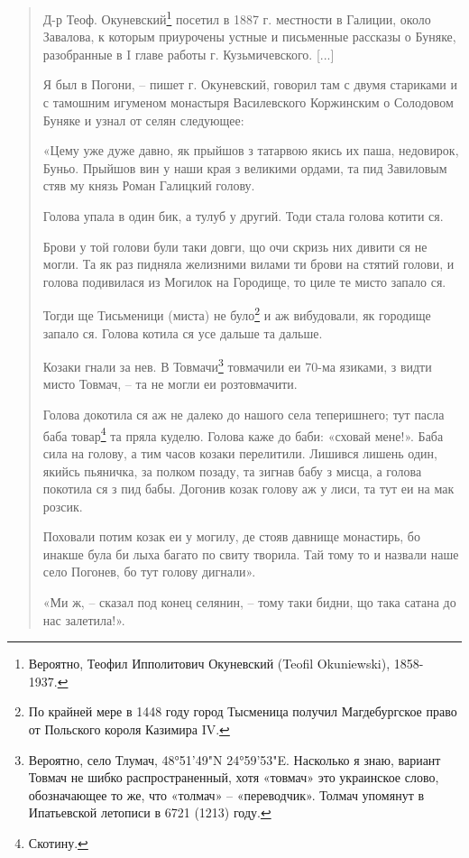 \begin{quotation}
Д-р Теоф. Окуневский\footnote{Вероятно, Теофил Ипполитович Окуневский (Teofil Okuniewski), 1858-1937.} посетил в 1887 г. местности в Галиции, около Завалова, к которым приурочены устные и письменные рассказы о Буняке, разобранные в I главе работы г. Кузьмичевского. [...]

Я был в Погони, – пишет г. Окуневский, говорил там с двумя стариками и с тамошним игуменом монастыря Василевского Коржинским о Солодовом Буняке и узнал от селян следующее: 

«Цему уже дуже давно, як прыйшов з татарвою якись их паша, недовирок, Буньо. Прыйшов вин у наши края з великими ордами, та пид Завиловым стяв му князь Роман Галицкий голову. 

Голова упала в один бик, а тулуб у другий. Тоди стала голова котити ся. 

Брови у той голови були таки довги, що очи скризь них дивити ся не могли. Та як раз пидняла желизними вилами ти брови на стятий голови, и голова подивилася из Могилок на Городище, то циле те мисто запало ся.

Тогди ще Тисьменици (миста) не було\footnote{По крайней мере в 1448 году город Тысменица получил Магдебургское право от Польского короля Казимира IV.} и аж вибудовали, як городище запало ся. Голова котила ся усе дальше та дальше. 

Козаки гнали за нев. В Товмачи\footnote{Вероятно, село Тлумач, 48°51'49"N 24°59'53"E. Насколько я знаю, вариант Товмач не шибко распространенный, хотя «товмач» это украинское слово, обозначающее то же, что «толмач» – «переводчик». Толмач упомянут в Ипатьевской летописи в 6721 (1213) году.} товмачили еи 70-ма язиками, з видти мисто Товмач, – та не могли еи розтовмачити. 

Голова докотила ся аж не далеко до нашого села теперишнего; тут пасла баба товар\footnote{Скотину.} та пряла куделю. Голова каже до баби: «сховай мене!». Баба сила на голову, а тим часов козаки перелитили. Лишився лишень один, якийсь пьяничка, за полком позаду, та зигнав бабу з мисца, а голова покотила ся з пид бабы. Догонив козак голову аж у лиси, та тут еи на мак розсик. 

Поховали потим козак еи у могилу, де стояв давнище монастирь, бо инакше була би лыха багато по свиту творила. Тай тому то и назвали наше село Погонев, бо тут голову дигнали».

«Ми ж, – сказал под конец селянин, – тому таки бидни, що така сатана до нас залетила!».


\end{quotation}
